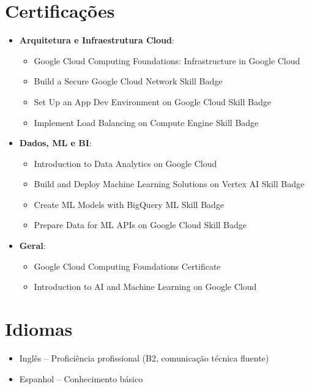 \documentclass[letterpaper,11pt]{article}
\newcommand{\resumeItem}[1]{
  \item\small{
    {#1 \vspace{-2pt}}
  }
}
\newcommand{\resumeSubHeadingListStart}{\begin{itemize}[leftmargin=0.0in, label={}]}
\newcommand{\resumeSubHeadingListEnd}{\end{itemize}}
\newcommand{\resumeItemListStart}{\begin{itemize}}
\newcommand{\resumeItemListEnd}{\end{itemize}\vspace{-5pt}}
\begin{document}
\section{Certificações}
  \resumeSubHeadingListStart
    \resumeItem{\textbf{Arquitetura e Infraestrutura Cloud}:}
    \resumeItemListStart
      \resumeItem{Google Cloud Computing Foundations: Infrastructure in Google Cloud}
      \resumeItem{Build a Secure Google Cloud Network Skill Badge}
      \resumeItem{Set Up an App Dev Environment on Google Cloud Skill Badge}
      \resumeItem{Implement Load Balancing on Compute Engine Skill Badge}
    \resumeItemListEnd
    \resumeItem{\textbf{Dados, ML e BI}:}
    \resumeItemListStart
      \resumeItem{Introduction to Data Analytics on Google Cloud}
      \resumeItem{Build and Deploy Machine Learning Solutions on Vertex AI Skill Badge}
      \resumeItem{Create ML Models with BigQuery ML Skill Badge}
      \resumeItem{Prepare Data for ML APIs on Google Cloud Skill Badge}
    \resumeItemListEnd
    \resumeItem{\textbf{Geral}:}
    \resumeItemListStart
      \resumeItem{Google Cloud Computing Foundations Certificate}
      \resumeItem{Introduction to AI and Machine Learning on Google Cloud}
    \resumeItemListEnd
  \resumeSubHeadingListEnd

\section{Idiomas}
  \resumeSubHeadingListStart
    \resumeItem{Inglês -- Proficiência profissional (B2, comunicação técnica fluente)}
    \resumeItem{Espanhol -- Conhecimento básico}
  \resumeSubHeadingListEnd
\end{document}
